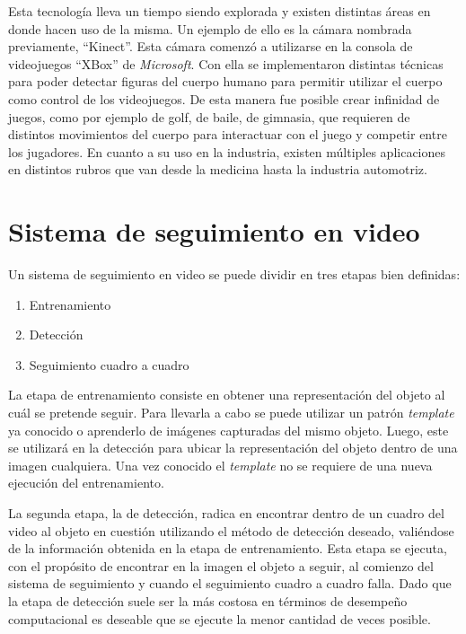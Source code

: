 Esta tecnología lleva un tiempo siendo explorada y existen distintas áreas en donde hacen uso de la misma. Un ejemplo de ello es la cámara nombrada previamente, ``Kinect''. Esta cámara comenzó a utilizarse en la consola de videojuegos ``XBox'' de \textit{Microsoft}. Con ella se implementaron distintas técnicas para poder detectar figuras del cuerpo humano para permitir utilizar el cuerpo como control de los videojuegos. De esta manera fue posible crear infinidad de juegos, como por ejemplo de golf, de baile, de gimnasia, que requieren de distintos movimientos del cuerpo para interactuar con el juego y competir entre los jugadores. En cuanto a su uso en la industria, existen múltiples aplicaciones en distintos rubros que van desde la medicina hasta la industria automotriz.


\chapter{Sistema de seguimiento en video}\label{chap:sistema_de_seguimiento}

Un sistema de seguimiento en video se puede dividir en tres etapas bien definidas:
\begin{enumerate}
 \item Entrenamiento
 \item Detección
 \item Seguimiento cuadro a cuadro
\end{enumerate}

La etapa de entrenamiento consiste en obtener una representación del objeto al cuál se pretende seguir. Para llevarla a cabo se puede utilizar un patrón \textit{template} ya conocido o aprenderlo de imágenes capturadas del mismo objeto. Luego, este se utilizará en la detección para ubicar la representación del objeto dentro de una imagen cualquiera. Una vez conocido el \textit{template} no se requiere de una nueva ejecución del entrenamiento.

La segunda etapa, la de detección, radica en encontrar dentro de un cuadro del video al objeto en cuestión utilizando el método de detección deseado, valiéndose de la información obtenida en la etapa de entrenamiento. Esta etapa se ejecuta, con el propósito de encontrar en la imagen el objeto a seguir, al comienzo del sistema de seguimiento y cuando el seguimiento cuadro a cuadro falla. Dado que la etapa de detección suele ser la más costosa en términos de desempeño computacional es deseable que se ejecute la menor cantidad de veces posible.

